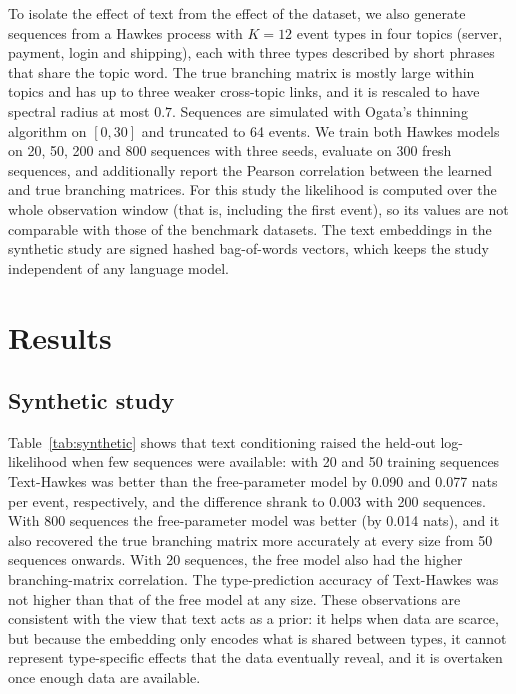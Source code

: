 \documentclass[preprint,12pt,authoryear]{elsarticle}
\begin{document}
To isolate the effect of text from the effect of the dataset, we also generate sequences from a Hawkes process with $K=12$ event types in four topics (server, payment, login and shipping), each with three types described by short phrases that share the topic word. The true branching matrix is mostly large within topics and has up to three weaker cross-topic links, and it is rescaled to have spectral radius at most $0.7$. Sequences are simulated with Ogata's thinning algorithm on $[0,30]$ and truncated to 64 events. We train both Hawkes models on 20, 50, 200 and 800 sequences with three seeds, evaluate on 300 fresh sequences, and additionally report the Pearson correlation between the learned and true branching matrices. For this study the likelihood is computed over the whole observation window (that is, including the first event), so its values are not comparable with those of the benchmark datasets. The text embeddings in the synthetic study are signed hashed bag-of-words vectors, which keeps the study independent of any language model.

\section{Results}
\label{sec:results}

\subsection{Synthetic study}

Table~\ref{tab:synthetic} shows that text conditioning raised the held-out log-likelihood when few sequences were available: with 20 and 50 training sequences Text-Hawkes was better than the free-parameter model by 0.090 and 0.077 nats per event, respectively, and the difference shrank to 0.003 with 200 sequences. With 800 sequences the free-parameter model was better (by 0.014 nats), and it also recovered the true branching matrix more accurately at every size from 50 sequences onwards. With 20 sequences, the free model also had the higher branching-matrix correlation. The type-prediction accuracy of Text-Hawkes was not higher than that of the free model at any size. These observations are consistent with the view that text acts as a prior: it helps when data are scarce, but because the embedding only encodes what is shared between types, it cannot represent type-specific effects that the data eventually reveal, and it is overtaken once enough data are available.


\end{document}
